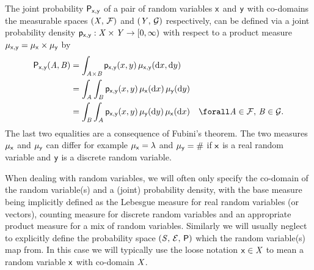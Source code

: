 The joint probability $\mathsf{P}_{\mathsf{x},\mathsf{y}}$ of a pair of random variables $\mathsf{x}$ and $\mathsf{y}$ with co-domains the measurable spaces $(\mathit{X},\,\mathcal{F})$ and $(\mathit{Y},\,\mathcal{G})$ respectively, can be defined via a joint probability density $\mathsf{p}_{\mathsf{x},\mathsf{y}} : \mathit{X} \times \mathit{Y} \to [0,\infty)$ with respect to a product measure $\mu_{\mathsf{x},\mathsf{y}} = \mu_{\mathsf{x}} \times \mu_{\mathsf{y}}$ by
\begin{equation}\label{eq:real-rv-joint-prob-dens}
\begin{split}
  \prob{\rvar{x},\rvar{y}}(\set{A},\set{B}) &=
  \int_{\set{A}\times\set{B}} 
    \pden{\rvar{x},\rvar{y}}(x,y)
  \,\mu_{\rvar{x},\rvar{y}}(\dr x, \dr y) 
  \\  
  &=
  \int_{\set{A}} \int_{\set{B}}
    \pden{\rvar{x},\rvar{y}}(x,y)
  \,\mu_{\rvar{x}}(\dr x)\,\mu_{\rvar{y}}(\dr y)
  \\  
  &=
  \int_{\set{B}} \int_{\set{A}}
    \pden{\rvar{x},\rvar{y}}(x,y)
  \,\mu_{\rvar{y}}(\dr y)\,\mu_{\rvar{x}}(\dr x)
  \quad \forall \set{A} \in \sset{F}, \,\set{B} \in \sset{G}.
\end{split}
\end{equation}
The last two equalities are a consequence of Fubini's theorem. The two measures $\mu_{\mathsf{x}}$ and $\mu_{\mathsf{y}}$ can differ for example $\mu_{\rvar{x}} = \lebm{1}$ and $\mu_{\mathsf{y}} = \#$ if $\mathsf{x}$ is a real random variable and $\mathsf{y}$ is a discrete random variable.

When dealing with random variables, we will often only specify the co-domain of the random variable(s) and a (joint) probability density, with the base measure being implicitly defined as the Lebesgue measure for real random variables (or vectors), counting measure for discrete random variables and an appropriate product measure for a mix of random variables. Similarly we will usually neglect to explicitly define the probability space $(\mathit{S},\,\mathcal{E},\,\mathsf{P})$ which the random variable(s) map from. In this case we will typically use the loose notation $\mathsf{x} \in \mathit{X}$ to mean a random variable $\mathsf{x}$ with co-domain $\mathit{X}$. 

